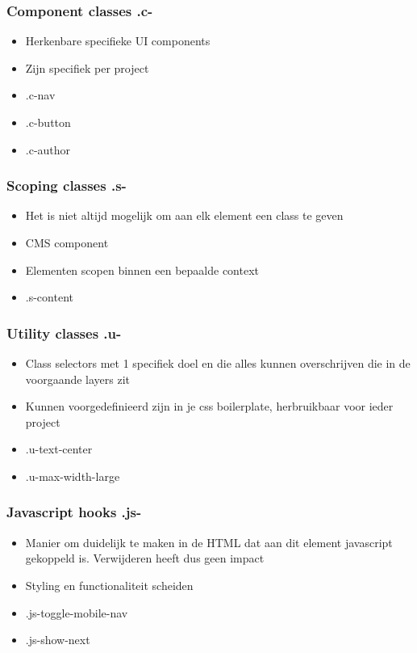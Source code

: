 \documentclass{article}
\begin{document}
\subsubsection{Component classes .c-}
\begin{itemize}
    \item Herkenbare specifieke UI components
    \item Zijn specifiek per project
    \item .c-nav
    \item .c-button
    \item .c-author
\end{itemize}

\subsubsection{Scoping classes .s-}
\begin{itemize}
    \item Het is niet altijd mogelijk om aan elk element een class te geven
    \item CMS component
    \item Elementen scopen binnen een bepaalde context
    \item .s-content
\end{itemize}

\subsubsection{Utility classes .u-}
\begin{itemize}
    \item Class selectors met 1 specifiek doel en die alles kunnen overschrijven die in de voorgaande layers zit
    \item Kunnen voorgedefinieerd zijn in je css boilerplate, herbruikbaar voor ieder project
    \item .u-text-center
    \item .u-max-width-large
\end{itemize}

\subsubsection{Javascript hooks .js-}
\begin{itemize}
    \item Manier om duidelijk te maken in de HTML dat aan dit element javascript gekoppeld is. Verwijderen heeft dus geen impact
    \item Styling en functionaliteit scheiden
    \item .js-toggle-mobile-nav
    \item .js-show-next
\end{itemize}
\end{document}
